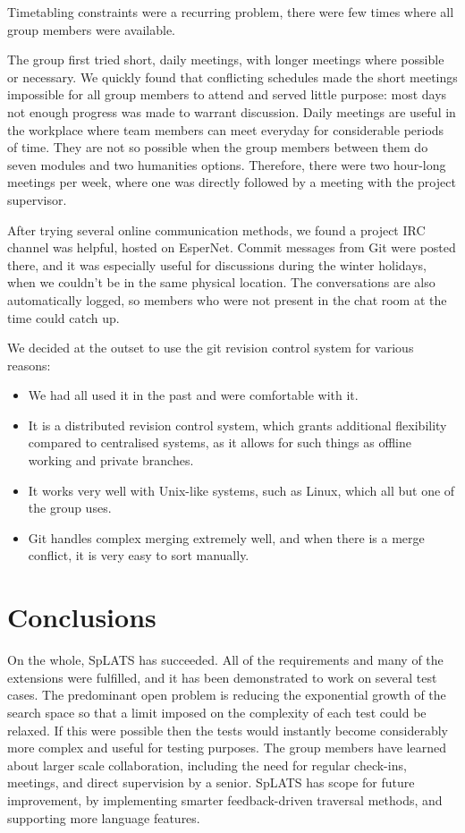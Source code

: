 \documentclass{report}
\begin{document}
Timetabling constraints were a recurring problem, there were few times where all group members were available.


The group first tried short, daily meetings, with longer meetings where possible or necessary.
    We quickly found that conflicting schedules made the short meetings impossible for all group members to attend and served little purpose: most days not enough progress was made to warrant discussion.
    Daily meetings are useful in the workplace where team members can meet everyday for considerable periods of time. They are not so possible when the group members between them do seven modules and two humanities options. Therefore, there were two hour-long meetings per week, where one was directly followed by a meeting with the project supervisor.

    After trying several online communication methods, we found a project IRC channel was helpful, hosted on EsperNet.
    Commit messages from Git were posted there, and it was especially useful for discussions during the winter holidays, when we couldn't be in the same physical location. The conversations are also automatically logged, so members who were not present in the chat room at the time could catch up.






We decided at the outset to use the git revision control system for various reasons:
      \begin{itemize}
      \item We had all used it in the past and were comfortable with it.
      \item It is a distributed revision control system, which grants additional flexibility compared to centralised systems, as it allows for such things as offline working and private branches.
      \item It works very well with Unix-like systems, such as Linux, which all but one of the group uses.
      \item Git handles complex merging extremely well, and when there is a merge conflict, it is very easy to sort manually.
      \end{itemize}

\section*{Conclusions}
 
On the whole, SpLATS has succeeded. All of the requirements and many of the extensions were fulfilled, and it has been demonstrated to work on several test cases. The predominant open problem is reducing the exponential growth of the search space so that a limit imposed on the complexity of each test could be relaxed. If this were possible then the tests would instantly become considerably more complex and useful for testing purposes.
The group members have learned about larger scale collaboration, including the need for regular check-ins, meetings, and direct supervision by a senior.
SpLATS has scope for future improvement, by implementing smarter feedback-driven traversal methods, and supporting more language features.
\end{document}
